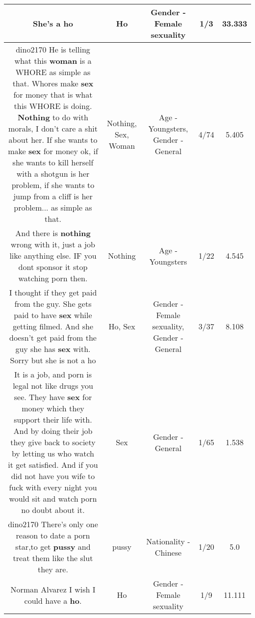 \documentclass[11pt]{article}
\newlength\mylength
\begin{document}
\begin{center}
\begin{longtable}{|C{.65\mylength}|C{.30\mylength}|C{.12\mylength}|C{.12\mylength}|C{.12\mylength}|}
  \small She's a ho\normalsize   & Ho & Gender - Female sexuality & 1/3 & 33.333 \\  \hline
  \small dino2170 He is telling what this \textbf{woman} is a WHORE as simple as that. Whores make \textbf{sex} for money that is what this WHORE is doing. \textbf{Nothing} to do with morals, I don't care a shit about her. If she wants to make \textbf{sex} for money ok, if she wants to kill herself with a shotgun is her problem, if she wants to jump from a cliff is her problem... as simple as that.\normalsize   & Nothing, Sex, Woman & Age - Youngsters, Gender - General & 4/74 & 5.405 \\  \hline
  \small And there is \textbf{nothing} wrong with it, just a job like anything else. IF you dont sponsor it stop watching porn then.\normalsize   & Nothing & Age - Youngsters & 1/22 & 4.545 \\  \hline
  \small I thought if they get paid from the guy. She gets paid to have \textbf{sex} while getting filmed. And she doesn't get paid from the guy she has \textbf{sex} with. Sorry but she is not a ho\normalsize   & Ho, Sex & Gender - Female sexuality, Gender - General & 3/37 & 8.108 \\  \hline
  \small It is a job, and porn is legal not like drugs you see. They have \textbf{sex} for money which they support their life with. And by doing their job they give back to society by letting us who watch it get satisfied. And if you did not have you wife to fuck with every night you would sit and watch porn no doubt about it.\normalsize   & Sex & Gender - General & 1/65 & 1.538 \\  \hline
  \small dino2170 There's only one reason to date a porn star,to get \textbf{pussy} and treat them like the slut they are.\normalsize   & pussy & Nationality - Chinese & 1/20 & 5.0 \\  \hline
  \small Norman Alvarez I wish I could have a \textbf{ho}.\normalsize   & Ho & Gender - Female sexuality & 1/9 & 11.111 \\  \hline

\end{longtable}
\end{center}
\end{document}
